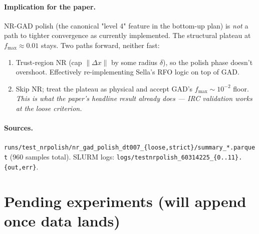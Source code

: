 \documentclass[11pt]{article}
\begin{document}
\paragraph{Implication for the paper.} NR-GAD polish (the canonical
"level 4" feature in the bottom-up plan) is \emph{not} a path to tighter
convergence as currently implemented. The structural plateau at
$f_{\max} \approx 0.01$ stays. Two paths forward, neither fast:
\begin{enumerate}[leftmargin=1.5em]
\item Trust-region NR (cap $\|\Delta x\|$ by some radius $\delta$), so
  the polish phase doesn't overshoot. Effectively re-implementing
  Sella's RFO logic on top of GAD.
\item Skip NR; treat the plateau as physical and accept GAD's
  $f_{\max}{\sim}10^{-2}$ floor. \emph{This is what the paper's headline
  result already does — IRC validation works at the loose criterion.}
\end{enumerate}

\paragraph{Sources.}
\texttt{runs/test\_nrpolish/nr\_gad\_polish\_dt007\_\{loose,strict\}/summary\_*.parquet}
(960 samples total). SLURM logs:
\texttt{logs/testnrpolish\_60314225\_\{0..11\}.\{out,err\}}.

\newpage
\section{Pending experiments (will append once data lands)}
\end{document}
